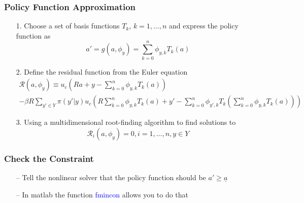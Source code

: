\documentclass[aspectratio=169, 11pt]{beamer}
\begin{document}
\begin{frame}
\frametitle{Policy Function Approximation}
  \begin{itemize}
    \item[1.] Choose a set of basis functions $T_{k}$, $k=1,\ldots,n$ and express the policy function as
    \[
      a'=g\left(a,\phi_{y}\right)=\sum_{k=0}^{n}\phi_{y,k}T_{k}\left(a\right)
    \]
    \item[2.] Define the residual function from the Euler equation
    \begin{multline*}
      \mathcal{R}\left(a,\phi_{y}\right)\equiv u_{c}\left(Ra+y-\sum_{k=0}^{n}\phi_{y,k}T_{k}\left(a\right)\right)\\
      -\beta R\sum_{y'\in Y}\pi\left(y'|y\right)u_{c}\left(R\sum_{k=0}^{n}\phi_{y,k}T_{k}\left(a\right)+y'-\sum_{k=0}^{n}\phi_{y',k}T_{k}\left(\sum_{k=0}^{n}\phi_{y,k}T_{k}\left(a\right)\right)\right)
    \end{multline*}
    \item[3.] Using a multidimensional root-finding algorithm to find solutions to
    \[
      \mathcal{R}_{i}\left(a,\phi_{y}\right)=0,i=1,\ldots,n,y\in Y
    \]
  \end{itemize}
\end{frame}

\begin{frame}
\frametitle{Check the Constraint}
  \begin{itemize}
    \item[--] Tell the nonlinear solver that the policy function should be $a'\geqslant\underline{a}$
    \bigskip
    \item[--] In matlab the function \textcolor{blue}{fmincon} allows you to do that
  \end{itemize}
\end{frame}
\end{document}
